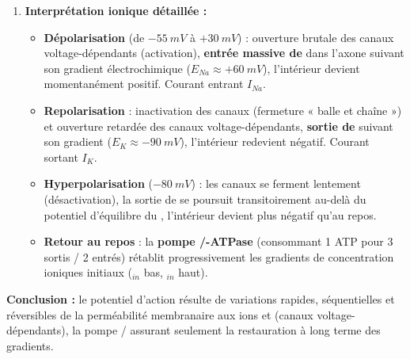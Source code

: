 \documentclass[11pt]{article}
\begin{document}
\begin{exoresolu}
\begin{enumerate}
\item \textbf{Interprétation ionique détaillée :}
\begin{itemize}
\item \textbf{Dépolarisation} (de $-\SI{55}{mV}$ à $+\SI{30}{mV}$) : ouverture brutale des canaux  voltage-dépendants (activation), \textbf{entrée massive de } dans l'axone suivant son gradient électrochimique ($E_{Na} \approx +\SI{60}{mV}$), l'intérieur devient momentanément positif. Courant entrant $I_{Na}$.
\item \textbf{Repolarisation} : inactivation des canaux  (fermeture « balle et chaîne ») et ouverture retardée des canaux  voltage-dépendants, \textbf{sortie de } suivant son gradient ($E_K \approx -\SI{90}{mV}$), l'intérieur redevient négatif. Courant sortant $I_K$.
\item \textbf{Hyperpolarisation} ($-\SI{80}{mV}$) : les canaux  se ferment lentement (désactivation), la sortie de  se poursuit transitoirement au-delà du potentiel d'équilibre du , l'intérieur devient plus négatif qu'au repos.
\item \textbf{Retour au repos} : la \textbf{pompe /-ATPase} (consommant 1 ATP pour 3  sortis / 2  entrés) rétablit progressivement les gradients de concentration ioniques initiaux ($_{in}$ bas, $_{in}$ haut).
\end{itemize}
\end{enumerate}
\textbf{Conclusion :} le potentiel d'action résulte de variations rapides, séquentielles et réversibles de la perméabilité membranaire aux ions  et  (canaux voltage-dépendants), la pompe / assurant seulement la restauration à long terme des gradients.
\end{exoresolu}
\end{document}
